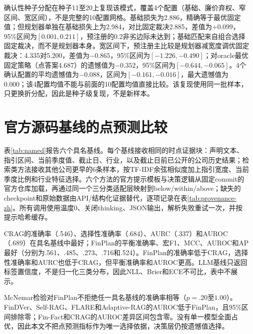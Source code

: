 \documentclass[12pt,openany]{ctexbook}
\begin{document}
确认性种子分配在种子11至20上复现该模式，覆盖4个配置（基础、廉价弃权、窄区间、宽区间），不是完整的10配置网格。基础损失为2.886，精确等于最优固定值；但规划器单独在基础损失上为2.984，对比固定裁决2.885，差值为$+0.099$，95\%区间为$[0.001,0.211]$，预注册的0.2非劣边际未达到；基础匹配来自组合选择固定裁决，而不是规划器本身。宽区间下，预注册主比较是规划器减宽度调优固定裁决：4.335对5.200，差值为$-0.865$，95\%区间为$[-1.226,-0.490]$；对oracle最优固定策略（点答案4.687）的遗憾值为$-0.352$，95\%区间为$[-0.644,-0.065]$。4个确认配置的平均遗憾值为$-0.088$，区间为$[-0.161,-0.016]$，最大遗憾值为0.000；该4配置均值不能与前面的10配置均值直接比较。该复现使用同一批样本，只更换折分配，因此是种子级复现，不是新样本。\par

\section{官方源码基线的点预测比较}
表\ref{tab:named}报告六个具名基线。每个基线接收相同的时点证据块：声明文本、指引区间、当前季度值、截止日、行业，以及截止日前已公开的公司历史结果；检索类方法接收其他公司更早的6条样本，按TF-IDF余弦相似度加上指引宽度、当前季度比例和行业特征选择。六个方法的官方提示模板与决策逻辑从固定commit的官方仓库加载，再通过同一个三分类适配层映射到below/within/above；缺失的checkpoint和原始数据由API/结构化证据替代，逐项记录在表\ref{tab:provenance-zh}。所有调用使用温度0、关闭thinking、JSON输出，解析失败重试一次，并按提示哈希缓存。\par
CRAG的准确率（.546）、选择性准确率（.684）、AURC（.337）和AUROC（.689）在具名基线中最好；FinPlan的平衡准确率、宏F1、MCC、AUROC和AP最好（分别为.561、.485、.273、.716和.524）。FinPlan的准确率低于CRAG，选择性准确率和AURC也低于CRAG，但平衡准确率和AUROC更高。LLM基线只返回标签置信度，不是归一化三类分布，因此NLL、Brier和ECE不可比，表中不展示。\par
McNemar检验对FinPlan不拒绝任一具名基线的准确率相等（$p=.20$至$1.00$）。FinDVer、Self-RAG、FLARE和Adaptive-RAG的AUROC低于FinPlan，且95\%区间排除零；Fin-Fact和CRAG的AUROC差异区间包含零。没有单一模型全面占优，因此本文不把点预测指标作为唯一选择依据，决策层仍按遗憾值选择。\par
\end{document}
